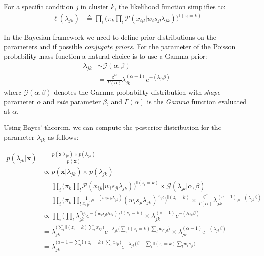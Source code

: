 For a specific condition $j$ in cluster $k$, the likelihood function simplifies to:
\begin{equation} \label{poisson-log-lin-mm-jk-app}
  \begin{split}
	\ell(\lambda_{jk}) & \triangleq \prod_{i} \bigg( \pi_{k} \prod_{l} \mathcal{P}(x_{ijl} | w_{i}s_{jl} \lambda_{jk})\bigg)^{\mathbb{I}(z_{i}=k)}
  \end{split}
\end{equation}

In the Bayesian framework we need to define prior distributions on the parameters and if possible \emph{conjugate priors}. For the parameter of the Poisson probability mass function a natural choice is to use a Gamma prior:
\begin{equation} \label{poisson-prior-mm-app}
  \begin{split}
  \lambda_{jk} & \sim \mathcal{G}(\alpha, \beta) \\
  	& = \frac{\beta^{\alpha}}{\Gamma(\alpha)}\lambda_{jk}^{(\alpha-1)} e^{-(\lambda_{jk}\beta)}
    \end{split}
\end{equation}
where $\mathcal{G}(\alpha, \beta)$ denotes the Gamma probability distribution with \emph{shape} parameter $\alpha$ and \emph{rate} parameter $\beta$, and $\Gamma(\alpha)$ is the \emph{Gamma} function evaluated at $\alpha$.

Using Bayes' theorem, we can compute the posterior distribution for the parameter $\lambda_{jk}$ as follows:

\begin{equation} \label{posterior-poisson-bayes-rule-app}
  \begin{split}
  	p(\lambda_{jk} | \mathbf{x}) & = \frac{p(\mathbf{x}| \lambda_{jk}) \times p(\lambda_{jk})}{p(\mathbf{x})} \\
  		& \propto p(\mathbf{x}| \lambda_{jk}) \times p(\lambda_{jk}) \\
  		& = \prod_{i} \bigg(\pi_{k} \prod_{l} \mathcal{P}(x_{ijl} | w_{i}s_{jl} \lambda_{jk})\bigg)^{\mathbb{I}(z_{i}=k)} \times \mathcal{G}(\lambda_{jk}|\alpha, \beta) \\
  		& = \prod_{i} \bigg(\pi_{k} \prod_{l} \frac{1}{x_{ijl}!} e^{-(w_{i}s_{jl}\lambda_{jk})} (w_{i}s_{jl}\lambda_{jk})^{x_{ijl}}\bigg)^{\mathbb{I}(z_{i}=k)} \times \frac{\beta^{\alpha}}{\Gamma(\alpha)}\lambda_{jk}^{(\alpha-1)} e^{-(\lambda_{jk}\beta)} \\
  		& \propto \prod_{i} \bigg( \prod_{l} \lambda_{jk}^{x_{ijl}} e^{-(w_{i}s_{jl}\lambda_{jk})}\bigg)^{\mathbb{I}(z_{i}=k)} \times \lambda_{jk}^{(\alpha-1)} e^{-(\lambda_{jk}\beta)} \\
  		& = \lambda_{jk}^{\big(\sum\limits_{i} \mathbb{I}(z_{i}=k) \sum\limits_{l} x_{ijl}\big)} e^{-\lambda_{jk}\big(\sum\limits_{i} \mathbb{I}(z_{i}=k) \sum\limits_{l} w_{i}s_{jl}\big)} \times \lambda_{jk}^{(\alpha-1)} e^{-(\lambda_{jk}\beta)} \\
		& = \lambda_{jk}^{\big(a - 1 + \sum\limits_{i} \mathbb{I}(z_{i}=k) \sum\limits_{l} x_{ijl}\big)} e^{-\lambda_{jk}\big(\beta + \sum\limits_{i} \mathbb{I}(z_{i}=k) \sum\limits_{l} w_{i}s_{jl} \big)}
  \end{split}
\end{equation}

